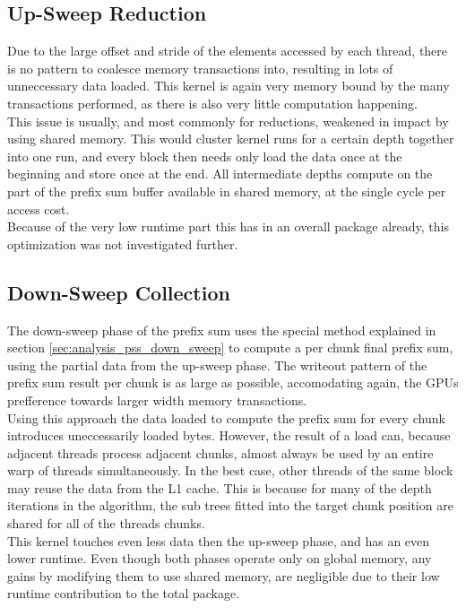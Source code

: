 \documentclass{tudscrreprt}
\begin{document}
			\subsection{Up-Sweep Reduction}
				Due to the large offset and stride of the elements accessed by each thread, there is no pattern to coalesce memory transactions into, resulting in lots of unneccessary data loaded. This kernel is again very memory bound by the many transactions performed, as there is also very little computation happening. \\
				This issue is usually, and most commonly for reductions, weakened in impact by using shared memory. This would cluster kernel runs for a certain depth together into one run, and every block then needs only load the data once at the beginning and store once at the end. All intermediate depths compute on the part of the prefix sum buffer available in shared memory, at the single cycle per access cost. \\
				Because of the very low runtime part this has in an overall package already, this optimization was not investigated further. \\
			 
			\subsection{Down-Sweep Collection}
				The down-sweep phase of the prefix sum uses the special method explained in section \ref{sec:analysis_pss_down_sweep} to compute a per chunk final prefix sum, using the partial data from the up-sweep phase. The writeout pattern of the prefix sum result per chunk is as large as possible, accomodating again, the GPUs prefference towards larger width memory transactions. \\
				Using this approach the data loaded to compute the prefix sum for every chunk introduces uneccessarily loaded bytes. However, the result of a load can, because adjacent threads process adjacent chunks, almost always be used by an entire warp of threads simultaneously. In the best case, other threads of the same block may reuse the data from the L1 cache. This is because for many of the depth iterations in the algorithm, the sub trees fitted into the target chunk position are shared for all of the threads chunks. \\
				
				This kernel touches even less data then the up-sweep phase, and has an even lower runtime. Even though both phases operate only on global memory, any gains by modifying them to use shared memory, are negligible due to their low runtime contribution to the total package.
		
\end{document}
